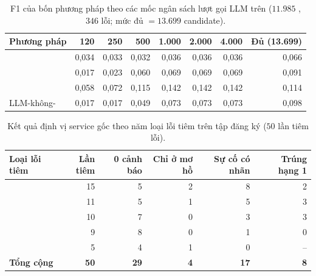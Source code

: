 \begin{table}[H]
  \centering
  \caption[Giá trị F1 theo ngân sách lần gọi LLM trên test]{F1 của bốn phương pháp theo các mốc ngân sách lượt gọi LLM trên  ($11.985$ , $346$ lỗi; mức đủ $= 13.699$ candidate).}
  \label{tab:ch5-budget}
  \tblfont
  \tblsetup
  \setlength{\tabcolsep}{4pt}
  \begin{tabularx}{\linewidth}{|Y|r|r|r|r|r|r|r|}
    \hline
    \textbf{Phương pháp} & \textbf{120} & \textbf{250} & \textbf{500} & \textbf{1.000} & \textbf{2.000} & \textbf{4.000} & \textbf{Đủ (13.699)} \\
    \hline
    \textbf{\CTAV{}} & 0,034 & 0,033 & 0,032 & 0,036 & 0,036 & 0,036 & 0,066 \\
    \hline
     & 0,017 & 0,023 & 0,060 & 0,069 & 0,069 & 0,069 & 0,091 \\
    \hline
     & 0,058 & 0,072 & 0,115 & 0,142 & 0,142 & 0,142 & 0,114 \\
    \hline
    LLM-không- & 0,017 & 0,017 & 0,049 & 0,073 & 0,073 & 0,073 & 0,098 \\
    \hline
  \end{tabularx}
\end{table}

\begin{table}[H]
  \centering
  \caption[Phân rã kết quả định vị RCA theo loại lỗi trên tập test]{Kết quả định vị service gốc theo năm loại lỗi tiêm trên tập  đăng ký ($50$ lần tiêm lỗi).}
  \label{tab:ch5-rca-by-fault}
  \tblfont
  \tblsetup
  \setlength{\tabcolsep}{4pt}
  \begin{tabularx}{\linewidth}{|Y|r|r|r|r|r|}
    \hline
    \textbf{Loại lỗi tiêm} & \textbf{Lần tiêm} & \textbf{0 cảnh báo} & \textbf{Chỉ ở mơ hồ} & \textbf{Sự cố có nhãn} & \textbf{Trúng hạng 1} \\
    \hline
     & 15 & 5 & 2 & 8 & 2 \\
    \hline
     & 11 & 5 & 1 & 5 & 3 \\
    \hline
     & 10 & 7 & 0 & 3 & 3 \\
    \hline
     & 9 & 8 & 0 & 1 & 0 \\
    \hline
     & 5 & 4 & 1 & 0 & -- \\
    \hline
    \textbf{Tổng cộng} & \textbf{50} & \textbf{29} & \textbf{4} & \textbf{17} & \textbf{8} \\
    \hline
  \end{tabularx}
\end{table}
